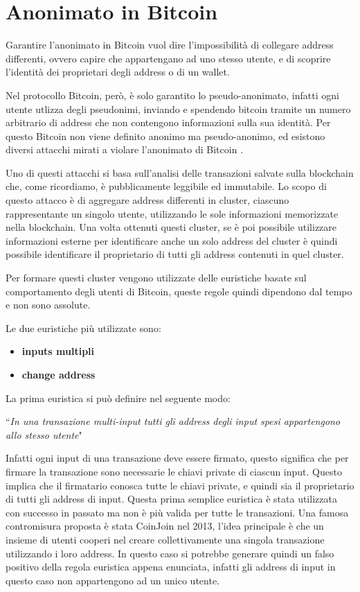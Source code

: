 \section{Anonimato in Bitcoin}\label{Anonimato}
Garantire l'anonimato in Bitcoin vuol dire l'impossibilità di collegare address differenti, ovvero capire che appartengano ad uno stesso utente, e di scoprire l'identità dei proprietari degli address o di un wallet.

Nel protocollo Bitcoin, però, è solo garantito lo pseudo-anonimato, infatti ogni utente utlizza degli pseudonimi, inviando e spendendo bitcoin tramite un numero arbitrario di address che non contengono informazioni sulla sua identità. Per questo Bitcoin non viene definito anonimo ma pseudo-anonimo, ed esistono diversi attacchi mirati a violare l'anonimato di Bitcoin \cite{de-anonimizzazione, de-anon2}.

Uno di questi attacchi si basa sull'analisi delle transazioni salvate sulla blockchain che, come ricordiamo, è pubblicamente leggibile ed immutabile. Lo scopo di questo attacco è di aggregare address differenti in cluster, ciascuno rappresentante un singolo utente, utilizzando le sole informazioni memorizzate nella blockchain. Una volta ottenuti questi cluster, se è poi possibile utilizzare informazioni esterne per identificare anche un solo address del cluster è quindi possibile identificare il proprietario di tutti gli address contenuti in quel cluster. 

Per formare questi cluster vengono utilizzate delle euristiche basate sul comportamento degli utenti di Bitcoin, queste regole quindi dipendono dal tempo e non sono assolute. 

Le due euristiche più utilizzate sono:
\begin{itemize}
    \item \textbf{inputs multipli}
    \item \textbf{change address}
\end{itemize}

La prima euristica si può definire nel seguente modo:
\begin{center}
    ``\textit{In una transazione multi-input tutti gli address degli input spesi appartengono allo stesso utente}"
\end{center}

Infatti ogni input di una transazione deve essere firmato, questo significa che per firmare la transazione sono necessarie le chiavi private di ciascun input. Questo implica che il firmatario conosca tutte le chiavi private, e quindi sia il proprietario di tutti gli address di input. Questa prima semplice euristica è stata utilizzata con successo in passato ma non è più valida per tutte le transazioni. Una famosa contromisura proposta è stata CoinJoin \cite{coinjoin} nel 2013, l'idea principale è che un insieme di utenti cooperi nel creare collettivamente una singola transazione utilizzando i loro address. In questo caso si potrebbe generare quindi un falso positivo della regola euristica appena enunciata, infatti gli address di input in questo caso non appartengono ad un unico utente.

